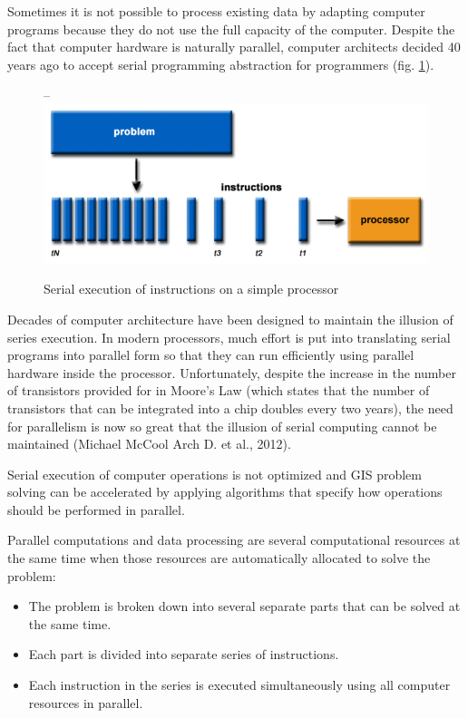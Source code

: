 {{{	Sometimes it is not possible to process existing data by adapting computer programs because they do not use the full capacity of the computer. Despite the fact that computer hardware is naturally parallel, computer architects decided 40 years ago to accept serial programming abstraction for programmers (fig. \ref{fig:seq_exec}).
	
	\begin{figure}[H]
		\centering
--		\includegraphics[width=0.9\linewidth]{images/seq_exec.png}
		\caption{Serial execution of instructions on a simple processor}
		\label{fig:seq_exec}
	\end{figure}

	Decades of computer architecture have been designed to maintain the illusion of series execution. In modern processors, much effort is put into translating serial programs into parallel form so that they can run efficiently using parallel hardware inside the processor. Unfortunately, despite the increase in the number of transistors provided for in Moore's Law (which states that the number of transistors that can be integrated into a chip doubles every two years), the need for parallelism is now so great that the illusion of serial computing cannot be maintained (Michael McCool Arch D. et al., 2012).
	
	Serial execution of computer operations is not optimized and GIS problem solving can be accelerated by applying algorithms that specify how operations should be performed in parallel.
	
	Parallel computations and data processing are several computational resources at the same time when those resources are automatically allocated to solve the problem:
	
	\begin{itemize}
		\item The problem is broken down into several separate parts that can be solved at the same time.
		\item Each part is divided into separate series of instructions.
		\item Each instruction in the series is executed simultaneously using all computer resources in parallel.
	\end{itemize}

}}}
